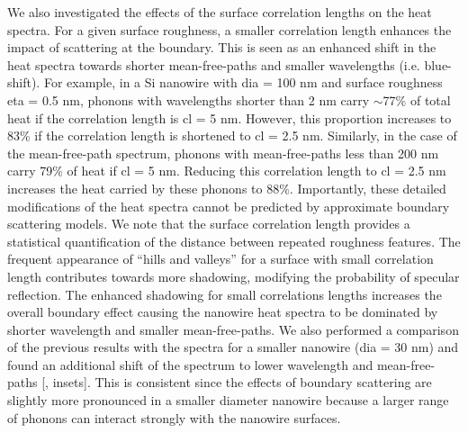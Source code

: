 \par We also investigated the effects of the surface correlation lengths on the heat spectra. For a given surface roughness, a smaller correlation length enhances the impact of scattering at the boundary. This is seen as an enhanced shift in the heat spectra towards shorter mean-free-paths and smaller wavelengths (i.e. blue-shift). For example, in a Si nanowire with \gls{dia} = 100 nm and surface roughness \gls{eta} = 0.5 nm, phonons with wavelengths shorter than 2 nm carry $\sim$77\% of total heat if the correlation length is \gls{cl} = 5 nm. However, this proportion increases to 83\% if the correlation length is shortened to \gls{cl} = 2.5 nm. Similarly, in the case of the mean-free-path spectrum, phonons with mean-free-paths less than 200 nm carry 79\% of heat if \gls{cl} = 5 nm. Reducing this correlation length to \gls{cl} = 2.5 nm increases the heat carried by these phonons to 88\%. Importantly, these detailed modifications of the heat spectra cannot be predicted by approximate boundary scattering models. We note that the surface correlation length provides a statistical quantification of the distance between repeated roughness features. The frequent appearance of “hills and valleys” for a surface with small correlation length contributes towards more shadowing, modifying the probability of specular reflection. The enhanced shadowing for small correlations lengths increases the overall boundary effect causing the nanowire heat spectra to be dominated by shorter wavelength and smaller mean-free-paths. We also performed a comparison of the previous results with the spectra for a smaller nanowire (\gls{dia} = 30 nm) and found an additional shift of the spectrum to lower wavelength and mean-free-paths [, insets]. This is consistent since the effects of boundary scattering are slightly more pronounced in a smaller diameter nanowire because a larger range of phonons can interact strongly with the nanowire surfaces.

